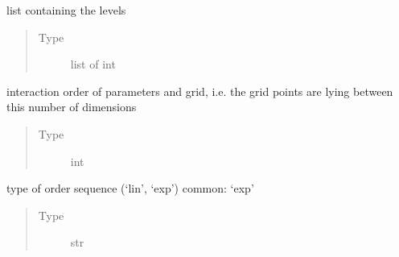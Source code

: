 \documentclass[letterpaper,10pt,english,openany,oneside]{sphinxmanual}
\begin{document}
\begin{fulllineitems}
\begin{fulllineitems}
\begin{quote}
\begin{description}
\end{description}\end{quote}

\end{fulllineitems}


\begin{fulllineitems}
\label{\detokenize{pygpc:pygpc.Grid.SparseGrid.level_sequence}}
list containing the levels
\begin{quote}\begin{description}
\item[{Type}] \leavevmode
list of int

\end{description}\end{quote}

\end{fulllineitems}


\begin{fulllineitems}
\label{\detokenize{pygpc:pygpc.Grid.SparseGrid.interaction_order}}
interaction order of parameters and grid, i.e. the grid points are lying between this number of dimensions
\begin{quote}\begin{description}
\item[{Type}] \leavevmode
int

\end{description}\end{quote}

\end{fulllineitems}


\begin{fulllineitems}
\label{\detokenize{pygpc:pygpc.Grid.SparseGrid.order_sequence_type}}
type of order sequence (‘lin’, ‘exp’) common: ‘exp’
\begin{quote}\begin{description}
\item[{Type}] \leavevmode
str

\end{description}\end{quote}


\end{fulllineitems}
\end{fulllineitems}
\end{document}

